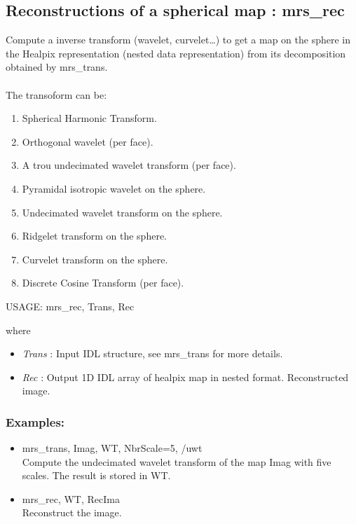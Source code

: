 \subsection{Reconstructions of a spherical map : mrs\_rec}
Compute a inverse transform (wavelet, curvelet\ldots) to get a map on the sphere in the Healpix representation 
(nested data representation) from its decomposition obtained by mrs\_trans.\\ \\
The transoform can be:
\begin{enumerate}
\item Spherical Harmonic Transform.
\item Orthogonal wavelet (per face).
\item A trou undecimated wavelet transform (per face).
\item Pyramidal isotropic wavelet on the sphere.
\item Undecimated wavelet transform on the sphere.
\item Ridgelet transform on the sphere.
\item Curvelet transform on the sphere.
\item Discrete Cosine Transform (per face).
\end{enumerate}
{\bf
\begin{center}
     USAGE: mrs\_rec, Trans, Rec
\end{center}}
where
\begin{itemize}
\item {\em Trans} : Input IDL structure, see mrs\_trans for more details.
\item {\em Rec} : Output 1D IDL array of healpix map in nested format. Reconstructed image.
\end{itemize}

\subsubsection*{Examples:} 
\begin{itemize}
\item mrs\_trans, Imag, WT, NbrScale=5, /uwt \\
Compute the undecimated wavelet transform of the map Imag with five scales. The result is stored in WT.
\item mrs\_rec, WT, RecIma \\
Reconstruct the image.
\end{itemize}




